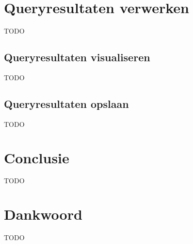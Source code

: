 \documentclass[conference]{IEEEtran}
\begin{document}
\section{Queryresultaten verwerken}
TODO

\subsection{Queryresultaten visualiseren}
TODO

\subsection{Queryresultaten opslaan}
TODO

\section*{Conclusie}
TODO

\section*{Dankwoord}
TODO



\end{document}
